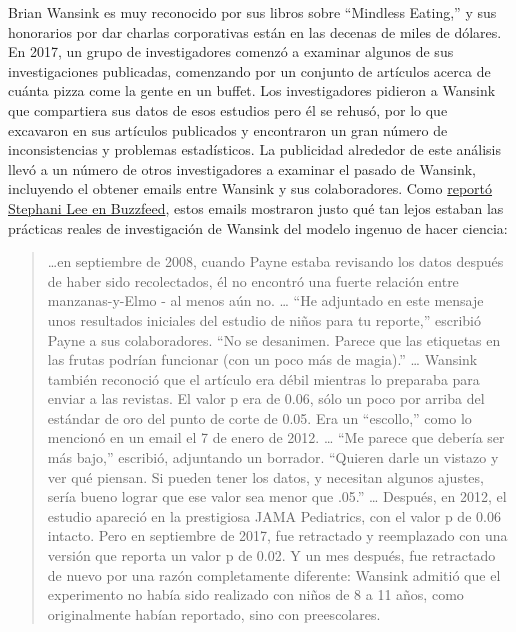 \documentclass[
  12pt,
]{book}
\begin{document}
Brian Wansink es muy reconocido por sus libros sobre ``Mindless Eating,'' y sus honorarios por dar charlas corporativas están en las decenas de miles de dólares. En 2017, un grupo de investigadores comenzó a examinar algunos de sus investigaciones publicadas, comenzando por un conjunto de artículos acerca de cuánta pizza come la gente en un buffet. Los investigadores pidieron a Wansink que compartiera sus datos de esos estudios pero él se rehusó, por lo que excavaron en sus artículos publicados y encontraron un gran número de inconsistencias y problemas estadísticos. La publicidad alrededor de este análisis llevó a un número de otros investigadores a examinar el pasado de Wansink, incluyendo el obtener emails entre Wansink y sus colaboradores. Como \href{https://www.buzzfeednews.com/article/stephaniemlee/brian-wansink-cornell-p-hacking}{reportó Stephani Lee en Buzzfeed}, estos emails mostraron justo qué tan lejos estaban las prácticas reales de investigación de Wansink del modelo ingenuo de hacer ciencia:

\begin{quote}
\ldots en septiembre de 2008, cuando Payne estaba revisando los datos después de haber sido recolectados, él no encontró una fuerte relación entre manzanas-y-Elmo - al menos aún no. \ldots{}
``He adjuntado en este mensaje unos resultados iniciales del estudio de niños para tu reporte,'' escribió Payne a sus colaboradores. ``No se desanimen. Parece que las etiquetas en las frutas podrían funcionar (con un poco más de magia).'' \ldots{}
Wansink también reconoció que el artículo era débil mientras lo preparaba para enviar a las revistas. El valor p era de 0.06, sólo un poco por arriba del estándar de oro del punto de corte de 0.05. Era un ``escollo,'' como lo mencionó en un email el 7 de enero de 2012. \ldots{}
``Me parece que debería ser más bajo,'' escribió, adjuntando un borrador. ``Quieren darle un vistazo y ver qué piensan. Si pueden tener los datos, y necesitan algunos ajustes, sería bueno lograr que ese valor sea menor que .05.'' \ldots{}
Después, en 2012, el estudio apareció en la prestigiosa JAMA Pediatrics, con el valor p de 0.06 intacto. Pero en septiembre de 2017, fue retractado y reemplazado con una versión que reporta un valor p de 0.02. Y un mes después, fue retractado de nuevo por una razón completamente diferente: Wansink admitió que el experimento no había sido realizado con niños de 8 a 11 años, como originalmente habían reportado, sino con preescolares.
\end{quote}
\end{document}

